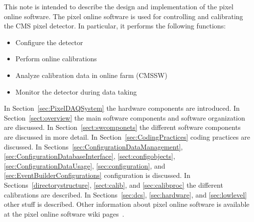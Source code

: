 
This note is intended to describe the design and implementation of the
pixel online software. The pixel online software is used for controlling and calibrating the CMS pixel
detector. In particular, it performs the following functions:
\begin{itemize}
\item Configure the detector
\item Perform online calibrations
\item Analyze calibration data in online farm (CMSSW)
\item Monitor the detector during data taking
\end{itemize}

In Section~\ref{sec:PixelDAQSystem} the hardware components are introduced.
In Section~\ref{sect:overview} the main software components and software organization are discussed.
In Section~\ref{sect:swcomponets} the different software components are discussed in more detail.
In Section~\ref{sec:CodingPractices} coding practices are discussed.
In Sections~\ref{sec:ConfigurationDataManagement}, \ref{sec:ConfigurationDatabaseInterface}, \ref{sect:configobjects}, \ref{sec:ConfigurationDataUsage}, \ref{sec:configuration}, and \ref{sec:EventBuilderConfigurations} configuration is discussed.
In Sections~\ref{directorystructure}, \ref{sect:calib}, and \ref{sec:calibproc} the different calibrations are described.
In Sections~\ref{sec:dcs}, \ref{sec:hardware}, and \ref{sec:lowlevel} other stuff is described.
Other information about pixel online software is available at the pixel online software wiki pages~\cite{poswiki}.

